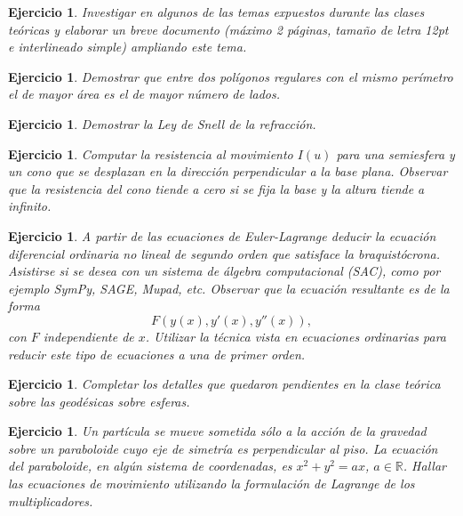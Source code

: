 \documentclass{article}
\newcounter{ejer}
\newtheorem{ejercicio}[ejer]{Ejercicio}}
\newcommand{\rr}{\mathbb{R}}
\begin{document}
\begin{ejercicio} Investigar en algunos de las temas expuestos durante las clases teóricas y elaborar un breve documento (máximo 2 páginas, tamaño de letra 12pt e  interlineado simple) ampliando este tema.
\end{ejercicio}

\begin{ejercicio} Demostrar que entre dos polígonos regulares con el mismo perímetro el de mayor área es el de mayor número de lados.
\end{ejercicio}

\begin{ejercicio} Demostrar la Ley de Snell de la refracción.
 \end{ejercicio}

 \begin{ejercicio} Computar la resistencia al movimiento $I(u)$ para una semiesfera y un cono que se desplazan en la dirección  perpendicular a la base plana.  Observar que la resistencia del cono tiende a cero si se fija la base y la altura tiende a infinito.
   \end{ejercicio}

 \begin{ejercicio} A partir de las ecuaciones de Euler-Lagrange deducir la ecuación diferencial ordinaria no lineal de segundo orden que satisface la braquistócrona. Asistirse si se desea con un sistema de álgebra computacional (SAC), como por ejemplo SymPy, SAGE, Mupad, etc.   Observar que la ecuación resultante es de la forma
  \[F(y(x),y'(x),y''(x)),\]
 con $F$ independiente de $x$. Utilizar la técnica vista en ecuaciones ordinarias para reducir este tipo de ecuaciones a una de primer orden.
 \end{ejercicio}

\begin{ejercicio} Completar los detalles que quedaron pendientes en la clase teórica sobre las geodésicas sobre esferas.
\end{ejercicio}

 \begin{ejercicio} Un partícula se mueve sometida sólo a la acción de la gravedad  sobre un paraboloide cuyo eje de simetría es perpendicular al piso. La ecuación del paraboloide, en algún sistema de coordenadas, es  $x^2+y^2=ax$, $a\in\rr$. Hallar las ecuaciones de movimiento utilizando la formulación de Lagrange de los multiplicadores.
\end{ejercicio}
\end{document}

